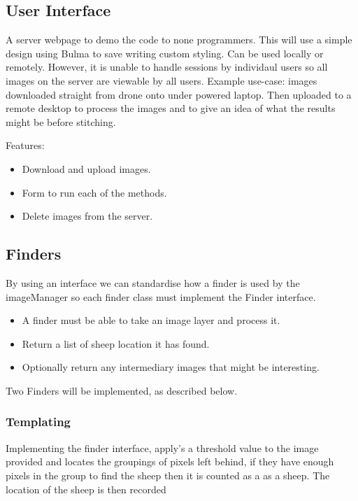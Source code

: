 \subsection{User Interface}
\label{FlaskServer}

A server webpage to demo the code to none programmers. This will use a simple design using Bulma\cite{bulma} to save writing custom styling. Can be used locally or remotely. However, it is unable to handle sessions by individaul users so all images on the server are viewable by all users. Example use-case: images downloaded straight from drone onto under powered laptop. Then uploaded to a remote desktop to process the images and to give an idea of what the results might be before stitching.


Features:

\begin{itemize}
    \item Download and upload images.
    \item Form to run each of the methods.
    \item Delete images from the server.
\end{itemize}

\subsection{Finders}

By using an interface we can standardise how a finder is used by the imageManager so each finder class must implement the Finder interface. 

\begin{itemize}
    \item A finder must be able to take an image layer and process it.
    \item Return a list of sheep location it has found. 
    \item Optionally return any intermediary images that might be interesting.
\end{itemize}

Two Finders will be implemented, as described below.

\subsubsection{Templating}

Implementing the finder interface, apply's a threshold value to the image provided and locates the groupings of pixels left behind, if they have enough pixels in the group to find the sheep then it is counted as a as a sheep. The location of the sheep is then recorded

